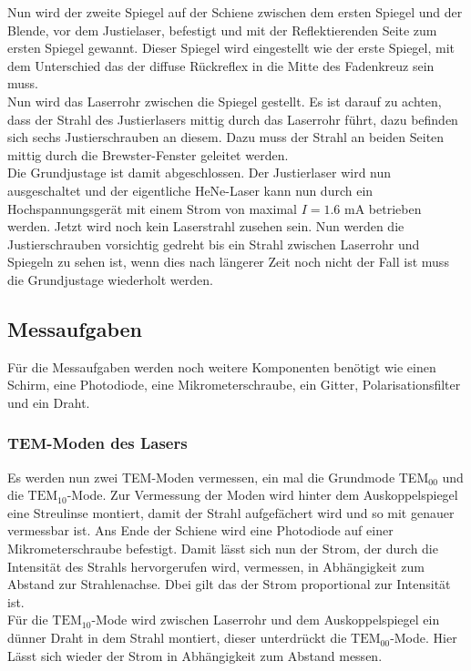 Nun wird der zweite Spiegel auf der Schiene zwischen dem ersten Spiegel und der Blende, vor dem Justielaser, befestigt und mit der Reflektierenden Seite zum ersten Spiegel gewannt. Dieser Spiegel wird eingestellt wie der erste Spiegel, mit dem Unterschied das der diffuse Rückreflex in die Mitte des Fadenkreuz sein muss.\\
Nun wird das Laserrohr zwischen die Spiegel gestellt. Es ist darauf zu achten, dass der Strahl des Justierlasers mittig durch das Laserrohr führt, dazu befinden sich sechs Justierschrauben an diesem. Dazu muss der Strahl an beiden Seiten mittig durch die Brewster-Fenster geleitet werden.\\
Die Grundjustage ist damit abgeschlossen. Der Justierlaser wird nun ausgeschaltet und der eigentliche HeNe-Laser kann nun durch ein Hochspannungsgerät mit einem Strom von maximal $I=1.6$ mA betrieben werden. Jetzt wird noch kein Laserstrahl zusehen sein. Nun werden die Justierschrauben vorsichtig gedreht bis ein Strahl zwischen Laserrohr und Spiegeln zu sehen ist, wenn dies nach längerer Zeit noch nicht der Fall ist muss die Grundjustage wiederholt werden.\\


\subsection{Messaufgaben}
Für die Messaufgaben werden noch weitere Komponenten benötigt wie einen Schirm, eine Photodiode, eine Mikrometerschraube, ein Gitter, Polarisationsfilter und ein Draht.
\subsubsection[TEM-Moden des Lasers]{$\mathbf{TEM}$-Moden des Lasers}
Es werden nun zwei TEM-Moden vermessen, ein mal die Grundmode TEM${}_{00}$ und die $\mathrm{TEM}_{10}$-Mode. Zur Vermessung der Moden wird hinter dem Auskoppelspiegel eine Streulinse montiert, damit der Strahl aufgefächert wird und so mit genauer vermessbar ist. Ans Ende der Schiene wird eine Photodiode auf einer Mikrometerschraube befestigt. Damit lässt sich nun der Strom, der durch die Intensität des Strahls hervorgerufen wird, vermessen, in Abhängigkeit zum Abstand zur Strahlenachse. Dbei gilt das der Strom proportional zur Intensität ist. \\
Für die $\mathrm{TEM}_{10}$-Mode wird zwischen Laserrohr und dem Auskoppelspiegel ein dünner Draht in dem Strahl montiert, dieser unterdrückt die $\mathrm{TEM}_{00}$-Mode. Hier Lässt sich wieder der Strom in Abhängigkeit zum Abstand messen.
